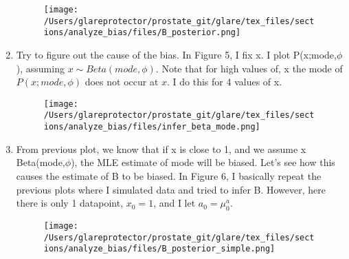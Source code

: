 \begin{enumerate}
\begin{figure}
\begin{center}
\texttt{[image: /Users/glareprotector/prostate\_git/glare/tex\_files/sections/analyze\_bias/files/B\_posterior.png]}
\caption{}
\end{center}
\end{figure}

\item Try to figure out the cause of the bias.  In Figure 5, I fix x. I plot P(x;mode,$\phi$), assuming $x \sim Beta(mode,\phi)$.  Note that for high values of, x the mode of $P(x;mode,\phi)$ does not occur at $x$.  I do this for 4 values of x.

\begin{figure}
\begin{center}
\texttt{[image: /Users/glareprotector/prostate\_git/glare/tex\_files/sections/analyze\_bias/files/infer\_beta\_mode.png]}
\caption{}
\end{center}
\end{figure}

\item From previous plot, we know that if x is close to 1, and we assume x ~ Beta(mode,$\phi$), the MLE estimate of mode will be biased.  Let's see how this causes the estimate of B to be biased.  In Figure 6, I basically repeat the previous plots where I simulated data and tried to infer B.  However, here there is only 1 datapoint, $x_0=1$, and I let $a_0=\mu_0^a$.

\begin{figure}
\begin{center}
\texttt{[image: /Users/glareprotector/prostate\_git/glare/tex\_files/sections/analyze\_bias/files/B\_posterior\_simple.png]}
\caption{}
\end{center}
\end{figure}

\end{enumerate}